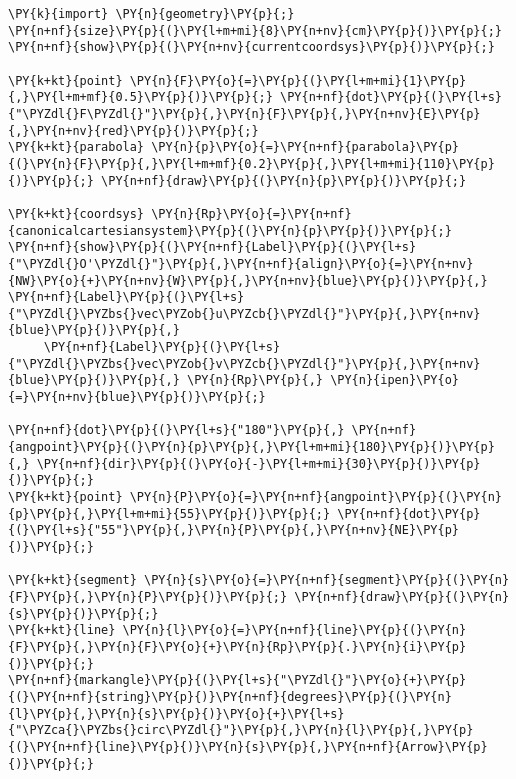 \begin{Verbatim}[commandchars=\\\{\}]
\PY{k}{import} \PY{n}{geometry}\PY{p}{;}
\PY{n+nf}{size}\PY{p}{(}\PY{l+m+mi}{8}\PY{n+nv}{cm}\PY{p}{)}\PY{p}{;}
\PY{n+nf}{show}\PY{p}{(}\PY{n+nv}{currentcoordsys}\PY{p}{)}\PY{p}{;}

\PY{k+kt}{point} \PY{n}{F}\PY{o}{=}\PY{p}{(}\PY{l+m+mi}{1}\PY{p}{,}\PY{l+m+mf}{0.5}\PY{p}{)}\PY{p}{;} \PY{n+nf}{dot}\PY{p}{(}\PY{l+s}{"\PYZdl{}F\PYZdl{}"}\PY{p}{,}\PY{n}{F}\PY{p}{,}\PY{n+nv}{E}\PY{p}{,}\PY{n+nv}{red}\PY{p}{)}\PY{p}{;}
\PY{k+kt}{parabola} \PY{n}{p}\PY{o}{=}\PY{n+nf}{parabola}\PY{p}{(}\PY{n}{F}\PY{p}{,}\PY{l+m+mf}{0.2}\PY{p}{,}\PY{l+m+mi}{110}\PY{p}{)}\PY{p}{;} \PY{n+nf}{draw}\PY{p}{(}\PY{n}{p}\PY{p}{)}\PY{p}{;}

\PY{k+kt}{coordsys} \PY{n}{Rp}\PY{o}{=}\PY{n+nf}{canonicalcartesiansystem}\PY{p}{(}\PY{n}{p}\PY{p}{)}\PY{p}{;}
\PY{n+nf}{show}\PY{p}{(}\PY{n+nf}{Label}\PY{p}{(}\PY{l+s}{"\PYZdl{}O'\PYZdl{}"}\PY{p}{,}\PY{n+nf}{align}\PY{o}{=}\PY{n+nv}{NW}\PY{o}{+}\PY{n+nv}{W}\PY{p}{,}\PY{n+nv}{blue}\PY{p}{)}\PY{p}{,} \PY{n+nf}{Label}\PY{p}{(}\PY{l+s}{"\PYZdl{}\PYZbs{}vec\PYZob{}u\PYZcb{}\PYZdl{}"}\PY{p}{,}\PY{n+nv}{blue}\PY{p}{)}\PY{p}{,}
     \PY{n+nf}{Label}\PY{p}{(}\PY{l+s}{"\PYZdl{}\PYZbs{}vec\PYZob{}v\PYZcb{}\PYZdl{}"}\PY{p}{,}\PY{n+nv}{blue}\PY{p}{)}\PY{p}{,} \PY{n}{Rp}\PY{p}{,} \PY{n}{ipen}\PY{o}{=}\PY{n+nv}{blue}\PY{p}{)}\PY{p}{;}

\PY{n+nf}{dot}\PY{p}{(}\PY{l+s}{"180"}\PY{p}{,} \PY{n+nf}{angpoint}\PY{p}{(}\PY{n}{p}\PY{p}{,}\PY{l+m+mi}{180}\PY{p}{)}\PY{p}{,} \PY{n+nf}{dir}\PY{p}{(}\PY{o}{-}\PY{l+m+mi}{30}\PY{p}{)}\PY{p}{)}\PY{p}{;}
\PY{k+kt}{point} \PY{n}{P}\PY{o}{=}\PY{n+nf}{angpoint}\PY{p}{(}\PY{n}{p}\PY{p}{,}\PY{l+m+mi}{55}\PY{p}{)}\PY{p}{;} \PY{n+nf}{dot}\PY{p}{(}\PY{l+s}{"55"}\PY{p}{,}\PY{n}{P}\PY{p}{,}\PY{n+nv}{NE}\PY{p}{)}\PY{p}{;}

\PY{k+kt}{segment} \PY{n}{s}\PY{o}{=}\PY{n+nf}{segment}\PY{p}{(}\PY{n}{F}\PY{p}{,}\PY{n}{P}\PY{p}{)}\PY{p}{;} \PY{n+nf}{draw}\PY{p}{(}\PY{n}{s}\PY{p}{)}\PY{p}{;}
\PY{k+kt}{line} \PY{n}{l}\PY{o}{=}\PY{n+nf}{line}\PY{p}{(}\PY{n}{F}\PY{p}{,}\PY{n}{F}\PY{o}{+}\PY{n}{Rp}\PY{p}{.}\PY{n}{i}\PY{p}{)}\PY{p}{;}
\PY{n+nf}{markangle}\PY{p}{(}\PY{l+s}{"\PYZdl{}"}\PY{o}{+}\PY{p}{(}\PY{n+nf}{string}\PY{p}{)}\PY{n+nf}{degrees}\PY{p}{(}\PY{n}{l}\PY{p}{,}\PY{n}{s}\PY{p}{)}\PY{o}{+}\PY{l+s}{"\PYZca{}\PYZbs{}circ\PYZdl{}"}\PY{p}{,}\PY{n}{l}\PY{p}{,}\PY{p}{(}\PY{n+nf}{line}\PY{p}{)}\PY{n}{s}\PY{p}{,}\PY{n+nf}{Arrow}\PY{p}{)}\PY{p}{;}


\end{Verbatim}
